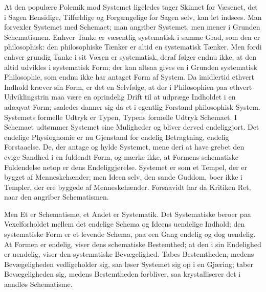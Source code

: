 \documentclass[12pt]{book}
\begin{document}
At den populære Polemik mod Systemet ligeledes tager Skinnet for Væsenet, det i
Sagen Eensidige, Tilfældige og Forgængelige for Sagen selv, kan let indsees. Man
forvexler Systemet med Schemaet; man angriber Systemet, men mener i Grunden
Schematismen. Enhver Tanke er væsentlig systematisk i samme Grad, som den er
philosophisk: den philosophiske Tænker er altid en systematisk Tænker. Men fordi
enhver grundig Tanke i sit Væsen er systematisk, deraf følger endnu ikke, at den
altid udvikles i systematisk Form; der kan altsaa gives en i Grunden systematisk
Philosophie, som endnu ikke har antaget Form af System. Da imidlertid ethvert
Indhold kræver sin Form, er det en Selvfølge, at der i Philosophien paa ethvert
Udviklingstrin maa være en oprindelig Drift til at udpræge Indholdet i en adæqvat
Form; saaledes danner sig da et i egentlig Forstand philosophisk System. Systemets
formelle Udtryk er Typen, Typens formelle Udtryk Schemaet. I Schemaet udtømmer
Systemet sine Muligheder og bliver derved endeliggjort. Det endelige Physiognomie
er nu Gjenstand for endelig Betragtning, endelig Forstaaelse. De, der antage og
hylde Systemet, mene deri at have grebet den evige Sandhed i en fuldendt Form, og
mærke ikke, at Formens schematiske Fuldendelse netop er dens Endeliggjørelse.
Systemet er som et Tempel, der er bygget af Menneskehænder; men Ideen selv, den
sande Guddom, boer ikke i Templer, der ere byggede af Menneskehænder. Forsaavidt
har da Kritiken Ret, naar den angriber Schematismen.

Men Et er Schematisme, et Andet er Systematik. Det Systematiske beroer paa
Vexelforholdet mellem det endelige Schema og Ideens uendelige Indhold; den
systematiske Form er et levende Schema, paa een Gang endelig og dog uendelig. At
Formen er endelig, viser dens schematiske Bestemthed; at den i sin Endelighed er
uendelig, viser den systematiske Bevægelighed. Tabes Bestemtheden, medens
Bevægeligheden vedligeholder sig, saa løser Systemet sig op i en Gjæring; taber
Bevægeligheden sig, medens Bestemtheden forbliver, saa krystalliserer det i
aandløs Schematisme.
\end{document}
